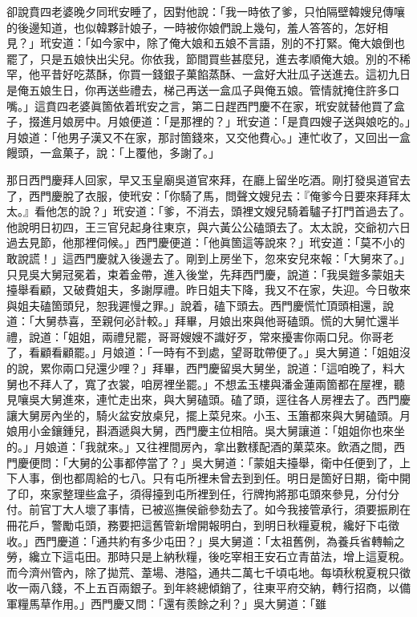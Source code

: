 卻說賁四老婆晚夕同玳安睡了，因對他說：「我一時依了爹，只怕隔壁韓嫂兒傳嚷的後邊知道，也似韓夥計娘子，一時被你娘們說上幾句，羞人答答的，怎好相見？」玳安道：「如今家中，除了俺大娘和五娘不言語，別的不打緊。俺大娘倒也罷了，只是五娘快出尖兒。你依我，節間買些甚麼兒，進去孝順俺大娘。別的不稀罕，他平昔好吃蒸酥，你買一錢銀子菓餡蒸酥、一盒好大壯瓜子送進去。這初九日是俺五娘生日，你再送些禮去，梯己再送一盒瓜子與俺五娘。管情就掩住許多口嘴。」{}這賁四老婆眞箇依着玳安之言，第二日趕西門慶不在家，玳安就替他買了盒子，掇進月娘房中。月娘便道：「是那裡的？」玳安道：「是賁四嫂子送與娘吃的。」月娘道：「他男子漢又不在家，那討箇錢來，又交他費心。」連忙收了，又回出一盒饅頭，一盒菓子，說：「上覆他，多謝了。」

那日西門慶拜人回家，早又玉皇廟吳道官來拜，在廳上留坐吃酒。剛打發吳道官去了，西門慶脫了衣服，使玳安：「你騎了馬，問聲文嫂兒去：『俺爹今日要來拜拜太太。』看他怎的說？」玳安道：「爹，不消去，頭裡文嫂兒騎着驢子打門首過去了。他說明日初四，王三官兒起身往東京，與六黃公公磕頭去了。太太說，交爺初六日過去見節，他那裡伺候。」西門慶便道：「他眞箇這等說來？」玳安道：「莫不小的敢說謊！」這西門慶就入後邊去了。剛到上房坐下，忽來安兒來報：「大舅來了。」只見吳大舅冠冕着，束着金帶，進入後堂，先拜西門慶，說道：「我吳鎧多蒙姐夫擡舉看顧，又破費姐夫，多謝厚禮。昨日姐夫下降，我又不在家，失迎。今日敬來與姐夫磕箇頭兒，恕我遲慢之罪。」說着，磕下頭去。西門慶慌忙頂頭相還，說道：「大舅恭喜，至親何必計較。」拜畢，月娘出來與他哥磕頭。慌的大舅忙還半禮，說道：「姐姐，兩禮兒罷，哥哥嫂嫂不識好歹，常來擾害你兩口兒。你哥老了，看顧看顧罷。」月娘道：「一時有不到處，望哥耽帶便了。」吳大舅道：「姐姐沒的說，累你兩口兒還少哩？」拜畢，西門慶留吳大舅坐，說道：「這咱晚了，料大舅也不拜人了，寬了衣裳，咱房裡坐罷。」不想孟玉樓與潘金蓮兩箇都在屋裡，聽見嚷吳大舅進來，連忙走出來，與大舅磕頭。磕了頭，逕往各人房裡去了。西門慶讓大舅房內坐的，騎火盆安放桌兒，擺上菜兒來。小玉、玉簫都來與大舅磕頭。月娘用小金鑲鍾兒，斟酒遞與大舅，西門慶主位相陪。吳大舅讓道：「姐姐你也來坐的。」月娘道：「我就來。」又往裡間房內，拿出數樣配酒的菓菜來。飲酒之間，西門慶便問：「大舅的公事都停當了？」吳大舅道：「蒙姐夫擡舉，衛中任便到了，上下人事，倒也都周給的七八。只有屯所裡未曾去到到任。明日是箇好日期，衛中開了印，來家整理些盒子，須得擡到屯所裡到任，行牌拘將那屯頭來參見，分付分付。前官丁大人壞了事情，已被巡撫侯爺參劾去了。如今我接管承行，須要振刷在冊花戶，警勵屯頭，務要把這舊管新增開報明白，到明日秋糧夏稅，纔好下屯徵收。」西門慶道：「通共約有多少屯田？」吳大舅道：「太祖舊例，為養兵省轉輸之勞，纔立下這屯田。那時只是上納秋糧，後吃宰相王安石立青苗法，增上這夏稅。而今濟州管內，除了拋荒、葦場、港隘，通共二萬七千頃屯地。每頃秋稅夏稅只徵收一兩八錢，不上五百兩銀子。到年終總傾銷了，往東平府交納，轉行招商，以備軍糧馬草作用。」西門慶又問：「還有羨餘之利？」吳大舅道：「雖